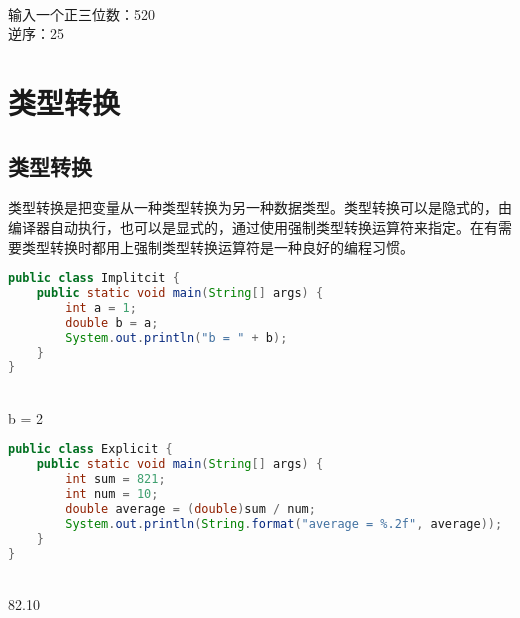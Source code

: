 \begin{tcolorbox}
	 \\
	输入一个正三位数：520 \\
	逆序：25
\end{tcolorbox}

\newpage

\section{类型转换}

\subsection{类型转换}

类型转换是把变量从一种类型转换为另一种数据类型。类型转换可以是隐式的，由编译器自动执行，也可以是显式的，通过使用强制类型转换运算符来指定。在有需要类型转换时都用上强制类型转换运算符是一种良好的编程习惯。 \\

\begin{lstlisting}[language=Java]
public class Implitcit {
	public static void main(String[] args) {
		int a = 1;
		double b = a;
		System.out.println("b = " + b);
	}
}
\end{lstlisting}

\begin{tcolorbox}
	 \\
	b = 2
\end{tcolorbox}

\vspace{0.5cm}
\begin{lstlisting}[language=Java]
public class Explicit {
	public static void main(String[] args) {
		int sum = 821;
		int num = 10;
		double average = (double)sum / num;
		System.out.println(String.format("average = %.2f", average));
	}
}
\end{lstlisting}

\begin{tcolorbox}
	 \\
	82.10
\end{tcolorbox}

\newpage